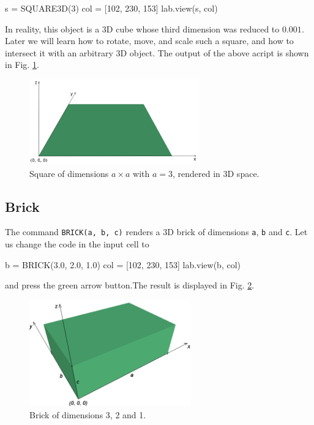 \begin{bluecode}
s = SQUARE3D(3)
col = [102, 230, 153]
lab.view(s, col)
\end{bluecode}
In reality, this object is a 3D cube whose third dimension was reduced
to $0.001$. Later we will learn how to rotate, move, and scale such a square, and how to 
intersect it with an arbitrary 3D object. The output of the above acript 
is shown in Fig. \ref{fig:square-112}.
\newpage
\begin{figure}[!ht]
\begin{center}
\includegraphics[width=0.65\textwidth]{img/square-112.png}
\end{center}
\vspace{-4mm}
\caption{Square of dimensions $a \times a$ with $a = 3$, rendered in 3D space.}
\label{fig:square-112}
\end{figure}
\noindent

\subsection{Brick}

The command {\tt BRICK(a, b, c)} 
renders a 3D brick of dimensions {\tt a}, {\tt b} and {\tt c}. 
Let us change the code in the input cell to  

\begin{bluecode}
b = BRICK(3.0, 2.0, 1.0)
col = [102, 230, 153]
lab.view(b, col)
\end{bluecode}
and press the green arrow button.The result is displayed in Fig. \ref{fig:cuboid-1}.

\begin{figure}[!ht]
\begin{center}
\includegraphics[width=0.62\textwidth]{img/cuboid-1.png}
\end{center}
\vspace{-4mm}
\caption{Brick of dimensions 3, 2 and 1.}
\label{fig:cuboid-1}
\vspace{-1cm}
\end{figure}
\newpage
\noindent

